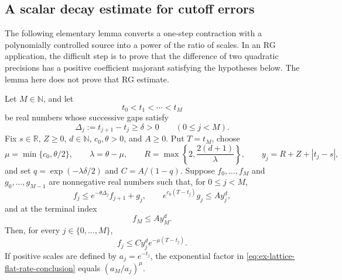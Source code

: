 \subsection{A scalar decay estimate for cutoff errors}
\label{sec:ex-lattice-flat-rate}

The following elementary lemma converts a one-step contraction with a
polynomially controlled source into a power of the ratio of scales. In an RG
application, the difficult step is to prove that the difference of two
quadratic precisions has a positive coefficient majorant satisfying the
hypotheses below. The lemma here does not prove that RG estimate.

\begin{proposition}
\label{prop:ex-lattice-flat-rate}
Let $M\in\mathbb N$, and let
\[
 t_0<t_1<\cdots<t_M
\]
be real numbers whose successive gaps satisfy
\[
 \Delta_j:=t_{j+1}-t_j\geq\delta>0
 \qquad(0\leq j<M).
\]
Fix $s\in\mathbb R$, $Z\geq0$, $d\in\mathbb N$, $c_0,\theta>0$, and $A\geq0$.
Put $T=t_M$, choose
\[
 \mu=\min\{c_0,\theta/2\},\qquad
 \lambda=\theta-\mu,\qquad
 R=\max\left\{2,\frac{2(d+1)}{\lambda}\right\},\qquad
 y_j=R+Z+|t_j-s|,
 \]
and set $q=\exp(-\lambda\delta/2)$ and $C=A/(1-q)$. Suppose
$f_0,\ldots,f_M$ and $g_0,\ldots,g_{M-1}$ are nonnegative real numbers such
that, for $0\leq j<M$,
\begin{equation}
 f_j\leq e^{-\theta\Delta_j}f_{j+1}+g_j,
 \qquad e^{c_0(T-t_j)}g_j\leq A y_j^d,
 \label{eq:ex-lattice-flat-rate-recurrence}
\end{equation}
and at the terminal index
\begin{equation}
 f_M\leq A y_M^d.
 \label{eq:ex-lattice-flat-rate-boundary}
\end{equation}
Then, for every $j\in\{0,\ldots,M\}$,
\begin{equation}
 f_j\leq C y_j^d e^{-\mu(T-t_j)}.
 \label{eq:ex-lattice-flat-rate-conclusion}
\end{equation}
If positive scales are defined by $a_j=e^{-t_j}$, the exponential factor in
\eqref{eq:ex-lattice-flat-rate-conclusion} equals $(a_M/a_j)^\mu$.
\end{proposition}

